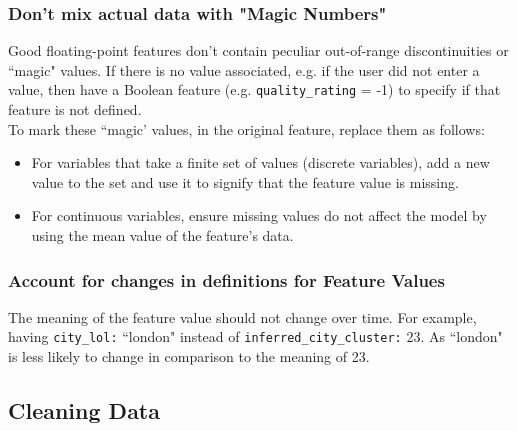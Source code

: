\documentclass[12pt]{article}
\begin{document}
\subsubsection{Don't mix actual data with "Magic Numbers"}
Good floating-point features don't contain peculiar out-of-range discontinuities or ``magic" values. If there is no value associated, e.g. if the user did not enter a value, then have a Boolean feature (e.g. {\tt{quality\_rating}} = -1) to specify if that feature is not defined.
\newline\\To mark these ``magic' values, in the original feature, replace them as follows: 
\begin{itemize}
	\item For variables that take a finite set of values (discrete variables), add a new value to the set and use it to signify that the feature value is missing.
	\item For continuous variables, ensure missing values do not affect the model by using the mean value of the feature's data.
\end{itemize}

\subsubsection{Account for changes in definitions for Feature Values}
The meaning of the feature value should not change over time. For example, having {\tt{city\_lol:}} ``london" instead of {\tt{inferred\_city\_cluster:}} 23. As ``london" is less likely to change in comparison to the meaning of 23.

\subsection{Cleaning Data}
\end{document}
